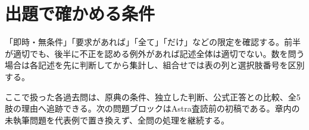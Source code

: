 \section{出題で確かめる条件}
「即時・無条件」「要求があれば」「全て」「だけ」などの限定を確認する。前半が適切でも、後半に不正を認める例外があれば記述全体は適切でない。数を問う場合は各記述を先に判断してから集計し、組合せでは表の列と選択肢番号を区別する。

ここで扱った各過去問は、原典の条件、独立した判断、公式正答との比較、全5肢の理由へ追跡できる。次の問題ブロックはAstra査読前の初稿である。章内の未執筆問題を代表例で置き換えず、全問の処理を継続する。



